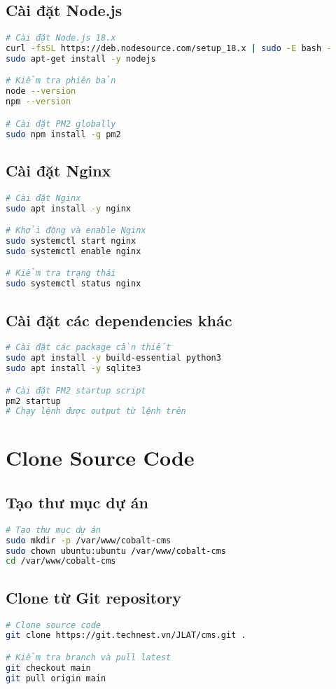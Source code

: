 \documentclass[12pt,a4paper]{article}
\begin{document}
\subsection{Cài đặt Node.js}
\begin{lstlisting}[language=bash]
# Cài đặt Node.js 18.x
curl -fsSL https://deb.nodesource.com/setup_18.x | sudo -E bash -
sudo apt-get install -y nodejs

# Kiểm tra phiên bản
node --version
npm --version

# Cài đặt PM2 globally
sudo npm install -g pm2
\end{lstlisting}

\subsection{Cài đặt Nginx}
\begin{lstlisting}[language=bash]
# Cài đặt Nginx
sudo apt install -y nginx

# Khởi động và enable Nginx
sudo systemctl start nginx
sudo systemctl enable nginx

# Kiểm tra trạng thái
sudo systemctl status nginx
\end{lstlisting}

\subsection{Cài đặt các dependencies khác}
\begin{lstlisting}[language=bash]
# Cài đặt các package cần thiết
sudo apt install -y build-essential python3
sudo apt install -y sqlite3

# Cài đặt PM2 startup script
pm2 startup
# Chạy lệnh được output từ lệnh trên
\end{lstlisting}

\section{Clone Source Code}

\subsection{Tạo thư mục dự án}
\begin{lstlisting}[language=bash]
# Tạo thư mục dự án
sudo mkdir -p /var/www/cobalt-cms
sudo chown ubuntu:ubuntu /var/www/cobalt-cms
cd /var/www/cobalt-cms
\end{lstlisting}

\subsection{Clone từ Git repository}
\begin{lstlisting}[language=bash]
# Clone source code
git clone https://git.technest.vn/JLAT/cms.git .

# Kiểm tra branch và pull latest
git checkout main
git pull origin main
\end{lstlisting}
\end{document}
